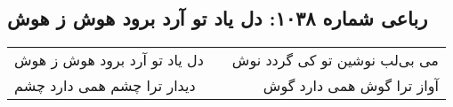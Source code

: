 \begin{center}
\section*{رباعی شماره ۱۰۳۸: دل یاد تو آرد برود هوش ز هوش}
\label{sec:1038}
\begin{longtable}{l p{0.5cm} r}
دل یاد تو آرد برود هوش ز هوش
&&
می بی‌لب نوشین تو کی گردد نوش
\\
دیدار ترا چشم همی دارد چشم
&&
آواز ترا گوش همی دارد گوش
\\
\end{longtable}
\end{center}
